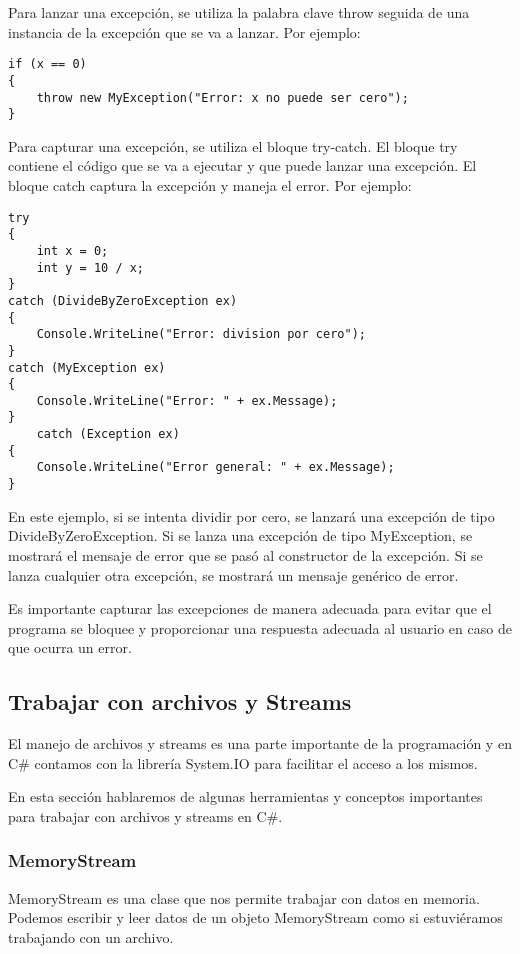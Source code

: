\documentclass[executivepaper]{article}
\begin{document}
Para lanzar una excepción, se utiliza la palabra clave throw seguida de una instancia de la excepción que se va a lanzar. Por ejemplo:

\begin{lstlisting}
if (x == 0)
{
    throw new MyException("Error: x no puede ser cero");
}
\end{lstlisting}

Para capturar una excepción, se utiliza el bloque try-catch. El bloque try contiene el código que se va a ejecutar y que puede lanzar una excepción. El bloque catch captura la excepción y maneja el error. Por ejemplo:

\begin{lstlisting}
try
{
    int x = 0;
    int y = 10 / x;
}
catch (DivideByZeroException ex)
{
    Console.WriteLine("Error: division por cero");
}
catch (MyException ex)
{
    Console.WriteLine("Error: " + ex.Message);
}
    catch (Exception ex)
{
    Console.WriteLine("Error general: " + ex.Message);
}
\end{lstlisting}

En este ejemplo, si se intenta dividir por cero, se lanzará una excepción de tipo DivideByZeroException. Si se lanza una excepción de tipo MyException, se mostrará el mensaje de error que se pasó al constructor de la excepción. Si se lanza cualquier otra excepción, se mostrará un mensaje genérico de error.

Es importante capturar las excepciones de manera adecuada para evitar que el programa se bloquee y proporcionar una respuesta adecuada al usuario en caso de que ocurra un error.

\subsection{Trabajar con archivos y Streams}

El manejo de archivos y streams es una parte importante de la programación y en C\# contamos con la librería System.IO para facilitar el acceso a los mismos.

En esta sección hablaremos de algunas herramientas y conceptos importantes para trabajar con archivos y streams en C\#.

\subsubsection*{MemoryStream}
MemoryStream es una clase que nos permite trabajar con datos en memoria. Podemos escribir y leer datos de un objeto MemoryStream como si estuviéramos trabajando con un archivo.
\end{document}
